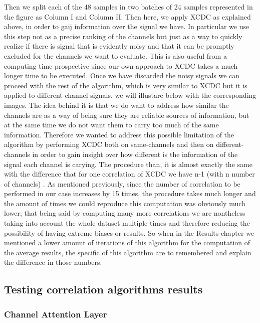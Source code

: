 \documentclass{Configuration_Files/PoliMi3i_thesis}
\begin{document}
Then we split each of the 48 samples in two batches of 24 samples represented in the figure as Column I and Column II.
Then here, we apply XCDC as explained above, in order to gaij information over the signal we have.
In particular we use this step not as a precise ranking of the channels but just as a way to quickly realize if there is signal that is evidently noisy and that it can be promptly excluded for the channels we want to evaluate.
This is also useful from a computing-time prospective since our own approach to XCDC takes a much longer time to be executed.
Once we have discarded the noisy signals we can proceed with the rest of the algorithm, which is very similar to XCDC but it is applied to different-channel signals, we will illustare below with the corresponding images.
The idea behind it is that we do want to address how similar the channels are as a way of being sure they are reliable sources of information, but at the same time we do not want them to carry too much of the same information.
Therefore we wanted to address this possible limitation of the algorithm by performing XCDC both on same-channels and then on different-channels in order to gain insight over how different is the information of the signal each channel is carying.
The procedure than, it is almost exactly the same with the difference that for one correlation of XCDC we have n-1 (with n number of channels) .
As mentioned previously, since the number of correlation to be performed in our case increases by 15 times, the procedure takes much longer and the amount of times we could reproduce this computation was obviously much lower; that being said by computing many more correlations we are nontheless taking into account the whole dataset multiple times and therefore reducing the possibility of having extreme biases or results.
So when in the Results chapter we mentioned a lower amount of iterations of this algorithm for the computation of the average results, the specific of this algorithm are to remembered and explain the difference in those numbers.


\subsection{Testing correlation algorithms results}

\subsubsection{Channel Attention Layer}
\end{document}
